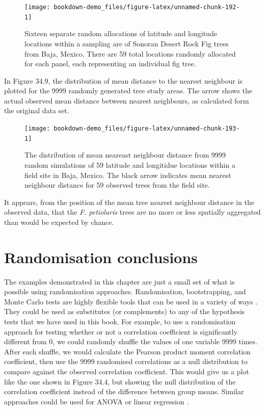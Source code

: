 \documentclass[
]{scrbook}
\begin{document}
\begin{figure}
\texttt{[image: bookdown-demo\_files/figure-latex/unnamed-chunk-192-1]} \caption{Sixteen separate random allocations of latitude and longitude locations within a sampling  are of Sonoran Desert Rock Fig trees from Baja, Mexico. There are 59 total locations randomly allocated for each panel, each representing an individual fig tree.}\label{fig:unnamed-chunk-192}
\end{figure}

In Figure 34.9, the distribution of mean distance to the nearest neighbour is plotted for the 9999 randomly generated tree study areas.
The arrow shows the actual observed mean distance between nearest neighbours, as calculated form the original data set.

\begin{figure}
\texttt{[image: bookdown-demo\_files/figure-latex/unnamed-chunk-193-1]} \caption{The distribution of mean neareast neighbour distance from 9999 random simulations of 59 latitude and longitidue locations within a field site in Baja, Mexico. The black arrow indicates mean nearest neighbour distance for 59 observed trees from the field site.}\label{fig:unnamed-chunk-193}
\end{figure}

It appears, from the position of the mean tree nearest neighbour distance in the observed data, that the \emph{F. petiolaris} trees are no more or less spatially aggregated than would be expected by chance.

\hypertarget{randomisation-conclusions}{%
\section{Randomisation conclusions}\label{randomisation-conclusions}}

The examples demonstrated in this chapter are just a small set of what is possible using randomisation approaches.
Randomisation, bootstrapping, and Monte Carlo tests are highly flexible tools that can be used in a variety of ways \citep{Manly2007}.
They could be used as substitutes (or complements) to any of the hypothesis tests that we have used in this book.
For example, to use a randomisation approach for testing whether or not a correlation coefficient is significantly different from 0, we could randomly shuffle the values of one variable 9999 times.
After each shuffle, we would calculate the Pearson product moment correlation coefficient, then use the 9999 randomised correlations as a null distribution to compare against the observed correlation coefficient.
This would give us a plot like the one shown in Figure 34.4, but showing the null distribution of the correlation coefficient instead of the difference between group means.
Similar approaches could be used for ANOVA or linear regression \citep{Manly2007}.
\end{document}
